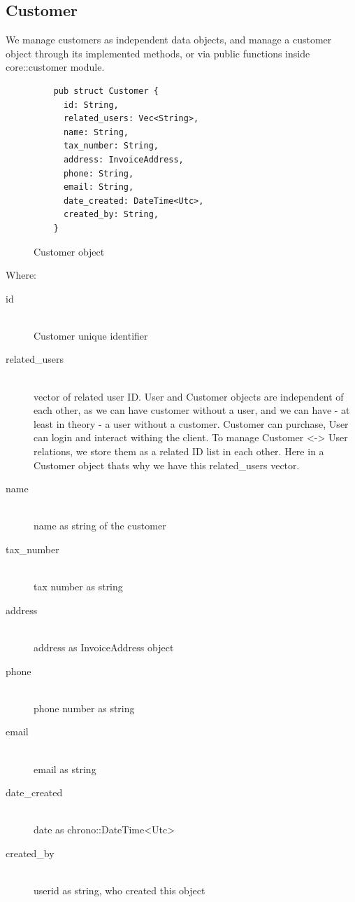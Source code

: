 \documentclass{article}
\begin{document}
\subsection{Customer}
\label{customer}

We manage customers as independent data objects, and manage a customer
object through its implemented methods, or via public functions inside
core::customer module.

\begin{figure}[!htb]
  \caption{Customer object}
  \begin{verbatim}
    pub struct Customer {
      id: String,
      related_users: Vec<String>,
      name: String,
      tax_number: String,
      address: InvoiceAddress,
      phone: String,
      email: String,
      date_created: DateTime<Utc>,
      created_by: String,
    }
  \end{verbatim}
\end{figure}

Where:

\begin{description}
  \item[id] \hfill
        \\ Customer unique identifier 
  \item[related\_users] \hfill
        \\ vector of related user ID. User and Customer objects are independent
        of each other, as we can have customer without a user, and we can have
        - at least in theory - a user without a customer. Customer can
        purchase, User can login and interact withing the client. To manage
        Customer <-> User relations, we store them as a related ID list in
        each other. Here in a Customer object thats why we have this
        related\_users vector.

  \item[name] \hfill
        \\ name as string of the customer

  \item[tax\_number] \hfill
        \\ tax number as string
  \item[address] \hfill
        \\ address as InvoiceAddress object 
  \item[phone] \hfill
        \\ phone number as string
  \item[email] \hfill
        \\ email as string
  \item[date\_created] \hfill
        \\ date as chrono::DateTime<Utc>
  \item[created\_by] \hfill
        \\ userid as string, who created this object 
\end{description}
\end{document}
